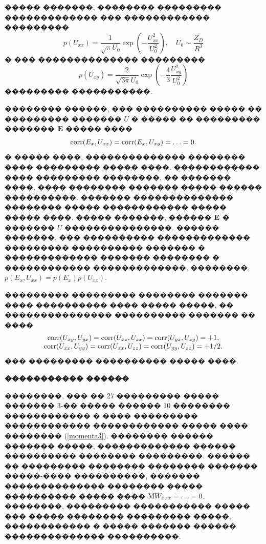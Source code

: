 \documentclass[12pt,titlepage]{article}
\newcommand\M{{\rm M}} %
\begin{document}
����� �������, �������� ��������� ������������� ��� ������������ ���������
\begin{equation}
    \label{distrib_U_diag}
    p(U_{xx}) = \frac{1}{\sqrt{\pi } U_{0} } \exp \left(-\frac{U_{xx}^{2} }{U_{0}^{2} } \right), \quad U_0 \sim \frac{Z_D}{R^3}
\end{equation}
� ��� �������������� ���������
\begin{equation}
    \label{distrib_U_nondiag}
    p(U_{xy}) = \frac{2}{\sqrt{3\pi } U_{0} } \exp \left(-\frac{4}{3} \frac{U_{xy}^{2} }{U_{0}^{2} } \right)
\end{equation}
��������� �����������.

�������� ������, ��� ���������� ����� �� ��������� ������� $U$ � ����� �� ��������� ������� ${\bf E}$ ����� ����
\begin{equation}
    {\rm corr}(E_x, U_{xx}) = {\rm corr}(E_x, U_{xy}) = \ldots = 0.
\end{equation}
� ����� ����, �������������� �������� ���� ��������� ����� ����. ������������ ���� ��������� ��������, �� ������� ����, ���� �������� ������� �����-������ ����������. ������� �������������� �������� ����� ������������ ����� ����� ����. ����� �������, ������ ${\bf E}$ � ������� $U$ ���������������. ������ �������, ��� ���������� ������������� ��������� ���������� ������� � ������������� ������� �������� � ������������ �������������, ��������, $p(E_x, U_{xx}) = p(E_x) p(U_{xx})$.

��������� ��������� �������� ������� ���� ���������� ���� ����� �����, �� ��������������� ���������� ������� �� ����
\begin{equation}
    \begin{array}{c}
    {\rm corr}(U_{xy},U_{yx}) = {\rm corr} (U_{xz}, U_{zx}) = {\rm corr} (U_{yz},U_{zy}) = +1, \\
    {\rm corr}(U_{xx},U_{yy}) = {\rm corr} (U_{xx}, U_{zz}) = {\rm corr} (U_{yy},U_{zz}) = +1/2.
    \end{array}
\end{equation}
��� ��������� ���������� ����� ����.

\bigskip

\textbf{����������� ������}

��������, ��� �� 27 ��������� ����� ������� 3-�� ����� ������ 10 �������� ������������ � ���� ��������� ������������ ������������ ����� ���� �������� (\ref{momenta3}). �������� ������ ������� �����, ������������� ������ ���������� �������� ���������. ������ �� ��������� �������� �������� ������� �����-���� ����������, ������� �������������� �������� ����� ���������� ����� ���� $\M W_{xxx} = \ldots = 0$. ��������, ��������� ����������� ����� ��� ����� �������� ��������� �����, ������������ � ����� ������� ������ �������������� ����������.
\end{document}
